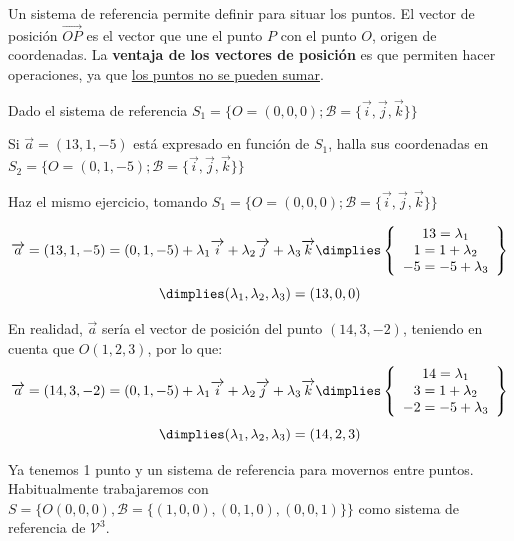 Un sistema de referencia permite definir  para situar los puntos.
%
El vector de posición $\vec{OP}$ es el vector que une el punto $P$ con el punto $O$, origen de coordenadas. 
%
La \textbf{ventaja de los vectores de posición} es que permiten hacer operaciones, ya que \ul{los puntos no se pueden sumar}.



\begin{problem}

Dado el sistema de referencia $S_1=\{O = (0,0,0); \mathcal{B} = \{\vec{i},\vec{j},\vec{k}\}\}$

\ppart Si $\vec{a} = (13,1,-5)$ está expresado en función de $S_1$, halla sus coordenadas en $S_2=\{O = (0,1,-5); \mathcal{B} = \{\vec{i},\vec{j},\vec{k}\}\}$

\ppart Haz el mismo ejercicio, tomando $S_1=\{O = (0,0,0); \mathcal{B} = \{\vec{i},\vec{j},\vec{k}\}\}$

\solution

\spart 
\[
  \vec{a} = (13,1,-5) = (0,1,-5) + \lambda_1\vec{i} + \lambda_2\vec{j} + \lambda_3\vec{k} \dimplies \left\{
    \begin{array}{c}
      13 = \lambda_1\\
      1 = 1 + \lambda_2\\
      -5 = -5 + \lambda_3
    \end{array}
  \right\} \]
\[\dimplies (\lambda_1,\lambda_2,\lambda_3) = (13,0,0)
\]

\spart 
En realidad, $\vec{a}$ sería el vector de posición del punto $(14,3,-2)$, teniendo en cuenta que $O(1,2,3)$, por lo que:
\[
  \vec{a} = (14,3,-2) = (0,1,-5) + \lambda_1\vec{i} + \lambda_2\vec{j} + \lambda_3\vec{k} \dimplies \left\{
    \begin{array}{c}
      14 = \lambda_1\\
      3 = 1 + \lambda_2\\
      -2 = -5 + \lambda_3
    \end{array}
  \right\} \]
\[\dimplies (\lambda_1,\lambda_2,\lambda_3) = (14,2,3)
\]



\end{problem}


\obs Ya tenemos 1 punto y un sistema de referencia para movernos entre puntos. 
%
Habitualmente trabajaremos con $S= \{O(0,0,0), \mathcal{B} = \{(1,0,0), (0,1,0), (0,0,1)\}\}$ como sistema de referencia de $\mathcal{V}^3$.




